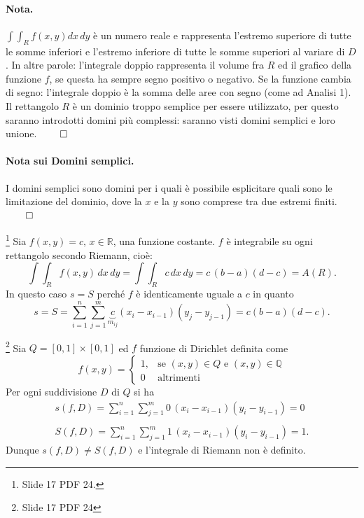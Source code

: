 \paragraph{Nota.} $\int\int_R f(x,y)dx\, dy$ è un numero reale e rappresenta l'estremo superiore di tutte le somme inferiori e l'estremo inferiore di tutte le somme superiori al variare di $D$. In altre parole: l'integrale doppio rappresenta il volume fra $R$ ed il grafico della funzione $f$, se questa ha sempre segno positivo o negativo. Se la funzione cambia di segno: l'integrale doppio è la somma delle aree con segno (come ad Analisi 1).\\
Il rettangolo $R$ è un dominio troppo semplice per essere utilizzato, per questo saranno introdotti domini più complessi: saranno visti domini semplici e loro unione. $\qed$

\paragraph{Nota sui Domini semplici.} I domini semplici sono domini per i quali è possibile esplicitare quali sono le limitazione del dominio, dove la $x$ e la $y$ sono comprese tra due estremi finiti. $\qed$

\begin{example}\footnote{Slide 17 PDF 24.}
	Sia $f(x,y)=c,\, x\in\mathbb{R}$, una funzione costante. $f$ è integrabile su ogni rettangolo secondo Riemann, cioè:
	\begin{equation*}
		\int\int_R f(x,y) \,dx\,dy = \int\int_R c\, dx\, dy = c\, (b-a)(d-c) = A(R).
	\end{equation*}
	In questo caso $s=S$ perché $f$ è identicamente uguale a $c$ in quanto
	\begin{equation*}
		s=S=\sum_{i=1}^{n}\sum_{j=1}^{m} \underbrace{c}_{m_{ij}}(x_i-x_{i-1})(y_j-y_{j-1}) = c(b-a)(d-c).
	\end{equation*}
\end{example}

\begin{example}\footnote{Slide 17 PDF 24}
	Sia $Q=[0,1]\times [0,1]$ ed $f$ funzione di Dirichlet definita come
	\begin{equation*}
		f(x,y) =
		\begin{cases}
			1, &\text{se } (x,y)\in Q \text{ e } (x,y)\in\mathbb{Q}\\
			0 &\text{altrimenti}
		\end{cases}
	\end{equation*}
	Per ogni suddivisione $D$ di $Q$ si ha
	\begin{equation*}
		\begin{aligned}
			s(f,D) = \sum_{i=1}^{n}\sum_{j=1}^{m} 0\, (x_i-x_{i-1}) (y_i-y_{i-1}) = 0\\\\
			S(f,D) = \sum_{i=1}^{n}\sum_{j=1}^{m} 1\, (x_i-x_{i-1})(y_i-y_{i-1}) = 1.
		\end{aligned}
	\end{equation*}
	Dunque $s(f,D) \neq S(f,D)$ e l'integrale di Riemann non è definito.
\end{example}

